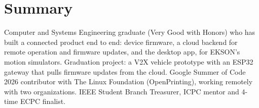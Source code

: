 \documentclass[10pt]{article}
\begin{document}

\section*{Summary}
Computer and Systems Engineering graduate (Very Good with Honors) who has built a connected product end to end: device firmware, a cloud backend for remote operation and firmware updates, and the desktop app, for EKSON's motion simulators. Graduation project: a V2X vehicle prototype with an ESP32 gateway that pulls firmware updates from the cloud. Google Summer of Code 2026 contributor with The Linux Foundation (OpenPrinting), working remotely with two organizations. IEEE Student Branch Treasurer, ICPC mentor and 4-time ECPC finalist.
\end{document}
